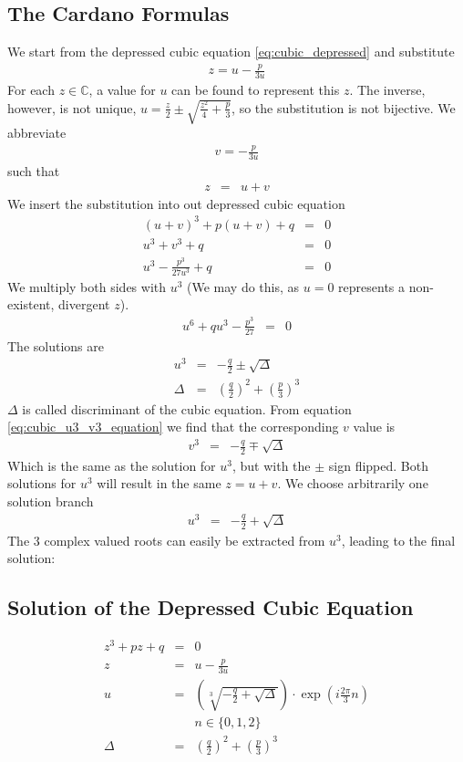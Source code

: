 \documentclass[12pt,a4paper,twoside,openright,BCOR10mm,headsepline,titlepage,abstracton,chapterprefix,final]{scrreprt}
\begin{document}
\subsection{The Cardano Formulas}
We start from the depressed cubic equation 
\ref{eq:cubic_depressed}
and substitute
\begin{eqnarray}
 z = u - \frac{p}{3u}
\end{eqnarray}
For each $z \in \mathbb{C}$,
a value for $u$ can be found to represent this $z$.
The inverse, however, is not unique,
$u = \frac{z}{2} \pm \sqrt{\frac{z^2}{4} + \frac{p}{3}}$,
so the substitution is not bijective.
We abbreviate
\begin{eqnarray}
 v = - \frac{p}{3u}
\end{eqnarray}
such that
\begin{eqnarray}
 z   &=& u+v
\end{eqnarray}
We insert the substitution into out depressed cubic equation
\begin{eqnarray}
 (u+v)^3 + p (u+v) + q &=& 0
 \\
 u^3 + v^3 + q &=& 0 \label{eq:cubic_u3_v3_equation}
 \\
 u^3 - \frac{p^3}{27 u^3} + q &=& 0
\end{eqnarray}
We multiply both sides with $u^3$
(We may do this, as $u=0$ represents a non-existent, divergent $z$).
\begin{eqnarray}
 u^6 + q u^3 - \frac{p^3}{27} &=& 0
\end{eqnarray}
The solutions are
\begin{eqnarray}
 u^3 &=& - \frac{q}{2} \pm \sqrt{\Delta}\\
 \Delta &=& \left(\frac{q}{2}\right)^2 + \left(\frac{p}{3}\right)^3
\end{eqnarray}
$\Delta$ is called discriminant of the cubic equation.
From equation \ref{eq:cubic_u3_v3_equation} we find that the corresponding $v$ value is
\begin{eqnarray}
 v^3 &=& - \frac{q}{2} \mp \sqrt{\Delta}
\end{eqnarray}
Which is the same as the solution for $u^3$, but with the $\pm$ sign flipped.
Both solutions for $u^3$ will result in the same $z=u+v$. 
We choose arbitrarily one solution branch
\begin{eqnarray}
 u^3 &=& - \frac{q}{2} + \sqrt{\Delta}
\end{eqnarray}
The 3 complex valued roots can easily be extracted from $u^3$, leading to the final solution:

\subsection{Solution of the Depressed Cubic Equation}
\begin{eqnarray}
  z^3 + p z + q &=& 0
  \\
  z &=& u - \frac{p}{3u} 
  \\
  u &=& \left( \sqrt[3]{- \frac{q}{2} + \sqrt{\Delta}} \right) 
  \cdot \exp\left(i\frac{2\pi}{3} n\right)
  \\
  && n \in \{ 0,1,2 \} \nonumber
  \\
  \Delta &=& \left(\frac{q}{2}\right)^2 + \left(\frac{p}{3}\right)^3
\end{eqnarray}
\end{document}
